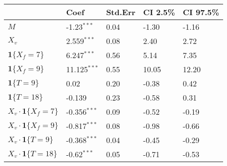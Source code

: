 \begin{tabular}{lllll}
  \hline
 & Coef & Std.Err & CI 2.5\% & CI 97.5\% \\ 
  \hline
$M$ & -1.23$^{***}$ & 0.04 & -1.30 & -1.16 \\ 
  $X_v$ & 2.559$^{***}$ & 0.08 & 2.40 & 2.72 \\ 
  $\textbf{1}\{X_f = 7\}$ & 6.247$^{***}$ & 0.56 & 5.14 & 7.35 \\ 
  $\textbf{1}\{X_f = 9\}$ & 11.125$^{***}$ & 0.55 & 10.05 & 12.20 \\ 
  $\textbf{1}\{T = 9\}$ & 0.02 & 0.20 & -0.38 & 0.42 \\ 
  $\textbf{1}\{T = 18\}$ & -0.139 & 0.23 & -0.58 & 0.31 \\ 
  $X_v\cdot\textbf{1}\{X_f = 7\}$ & -0.356$^{***}$ & 0.09 & -0.52 & -0.19 \\ 
  $X_v\cdot\textbf{1}\{X_f = 9\}$ & -0.817$^{***}$ & 0.08 & -0.98 & -0.66 \\ 
  $X_v\cdot\textbf{1}\{T = 9\}$ & -0.368$^{***}$ & 0.04 & -0.45 & -0.29 \\ 
  $X_v\cdot\textbf{1}\{T = 18\}$ & -0.62$^{***}$ & 0.05 & -0.71 & -0.53 \\ 
   \hline
\end{tabular}

